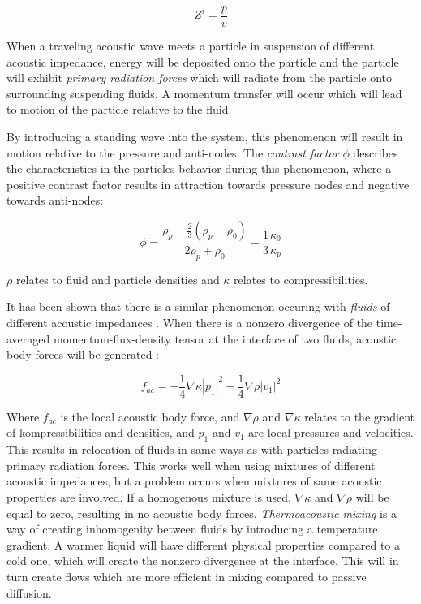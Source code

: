 \documentclass[twoside,twocolumn,9pt,a4paper]{IEEEtran}
\begin{document}
\[Z^i = \frac{p}{v}\] 

When a traveling acoustic wave meets a particle in suspension of different acoustic impedance, energy will be deposited onto the particle and the particle will exhibit \textit{primary radiation forces}\cite{Corato} which will radiate from the particle onto surrounding suspending fluids. A momentum transfer will occur which will lead to motion of the particle relative to the fluid.

By introducing a standing wave into the system, this phenomenon will result in motion relative to the pressure and anti-nodes. The \textit{contrast factor \(\phi\)} describes the characteristics in the particles behavior during this phenomenon, where a positive contrast factor results in attraction towards pressure nodes and negative towards anti-nodes:

\[ \phi = \frac{\rho_p - \frac{2}{3}(\rho_p-\rho_0)}{2\rho_p+\rho_0}-\frac{1}{3}\frac{\kappa_0}{\kappa_p}\] 

\(\rho\) relates to fluid and particle densities and \(\kappa\) relates to compressibilities.

It has been shown that there is a similar phenomenon occuring with \textit{fluids} of different acoustic impedances \cite{Jonas}. When there is a nonzero divergence of the time-averaged momentum-flux-density tensor at the interface of two fluids, acoustic body forces will be generated \cite{Jonastensor}:

\[f_{ac} = -\frac{1}{4}\nabla\kappa|p_1|^2-\frac{1}{4}\nabla\rho|v_1|^2\]

Where \(f_{ac}\) is the local acoustic body force, and \(\nabla\rho\) and \(\nabla\kappa\) relates to the gradient of kompressibilities and densities, and \(p_1\) and \(v_1\) are local pressures and velocities.
This results in relocation of fluids in same ways as with particles radiating primary radiation forces.
This works well when using mixtures of different acoustic impedances, but a problem occurs when mixtures of same acoustic properties are involved. If a homogenous mixture is used, \(\nabla\kappa\) and \(\nabla\rho\) will be equal to zero, resulting in no acoustic body forces. \textit{Thermoacoustic mixing} is a way of creating inhomogenity between fluids by introducing a temperature gradient. A warmer liquid will have different physical properties compared to a cold one, which will create the nonzero divergence at the interface. This will in turn create flows which are more efficient in mixing compared to passive diffusion\cite{Qiu}.
\end{document}
